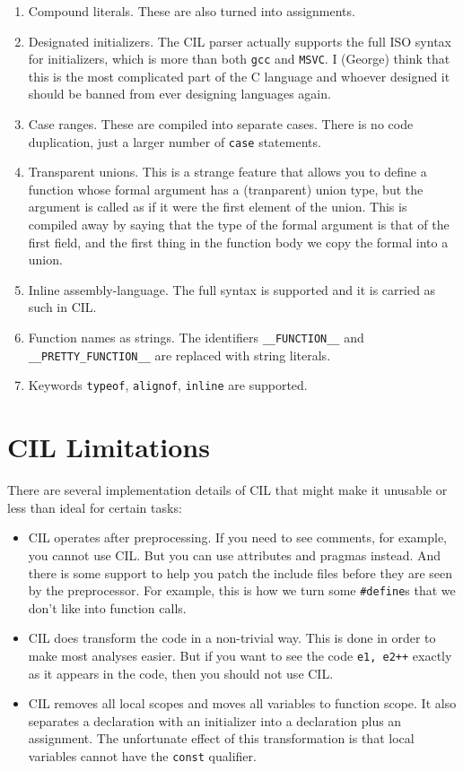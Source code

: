 \documentclass[letterpaper]{article}
\def\t#1{{\tt #1}}
\begin{document}
\begin{enumerate}
compiled into assignments.
\item Compound literals. These are also turned into assignments.
\item Designated initializers. The CIL parser actually supports the full ISO
syntax for initializers, which is more than both \t{gcc} and \t{MSVC}. I
(George) think that this is the most complicated part of the C language and
whoever designed it should be banned from ever designing languages again.
\item Case ranges. These are compiled into separate cases. There is no code
duplication, just a larger number of \t{case} statements.
\item Transparent unions. This is a strange feature that allows you to define
a function whose formal argument has a (tranparent) union type, but the
argument is called as if it were the first element of the union. This is
compiled away by saying that the type of the formal argument is that of the
first field, and the first thing in the function body we copy the formal into
a union.

\item Inline assembly-language. The full syntax is supported and it is carried
as such in CIL.

\item Function names as strings. The identifiers \t{\_\_FUNCTION\_\_} and
\t{\_\_PRETTY\_FUNCTION\_\_} are replaced with string literals.

\item Keywords \t{typeof}, \t{alignof}, \t{inline} are supported.
\end{enumerate}

\section{CIL Limitations}

 There are several implementation details of CIL that might make it unusable
 or less than ideal for certain tasks:

\begin{itemize}
\item CIL operates after preprocessing. If you need to see comments, for
example, you cannot use CIL. But you can use attributes and pragmas instead.
And there is some support to help you patch the include files before they are
seen by the preprocessor. For example, this is how we turn some
\t{\#define}s that we don't like into function calls.

\item CIL does transform the code in a non-trivial way. This is done in order
to make most analyses easier. But if you want to see the code \t{e1, e2++}
exactly as it appears in the code, then you should not use CIL.

\item CIL removes all local scopes and moves all variables to function
scope. It also separates a declaration with an initializer into a declaration
plus an assignment. The unfortunate effect of this transformation is that
local variables cannot have the \t{const} qualifier.

\end{itemize}
\end{document}
